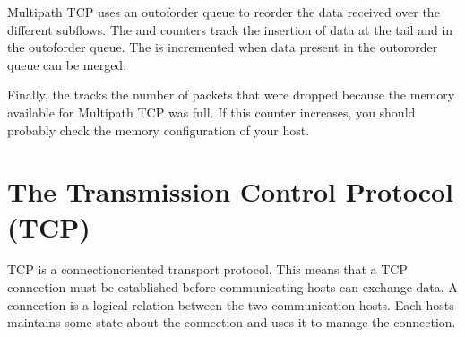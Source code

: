 \documentclass[letterpaper,10pt,english]{sphinxmanual}
\begin{document}
\sphinxAtStartPar
Multipath TCP uses an out\sphinxhyphen{}of\sphinxhyphen{}order queue to reorder the data received over
the different subflows. The  and    counters track the insertion of data at the tail and in the out\sphinxhyphen{}of\sphinxhyphen{}order
queue. The  is incremented when data present in the
out\sphinxhyphen{}or\sphinxhyphen{}order queue can be merged.

\sphinxAtStartPar
Finally, the  tracks the number of packets that
were dropped because the memory available for Multipath TCP was full.
If this counter increases, you should probably check the memory configuration
of your host.


\chapter{The Transmission Control Protocol (TCP)}
\label{\detokenize{tcp:the-transmission-control-protocol-tcp}}\label{\detokenize{tcp:chapter-tcp}}\label{\detokenize{tcp::doc}}
\sphinxAtStartPar
TCP is a connection\sphinxhyphen{}oriented transport protocol. This means that a TCP connection must be established before communicating hosts can exchange data. A connection is a logical relation between the two communication hosts. Each hosts maintains some state about the connection and uses it to manage the connection.
\end{document}
